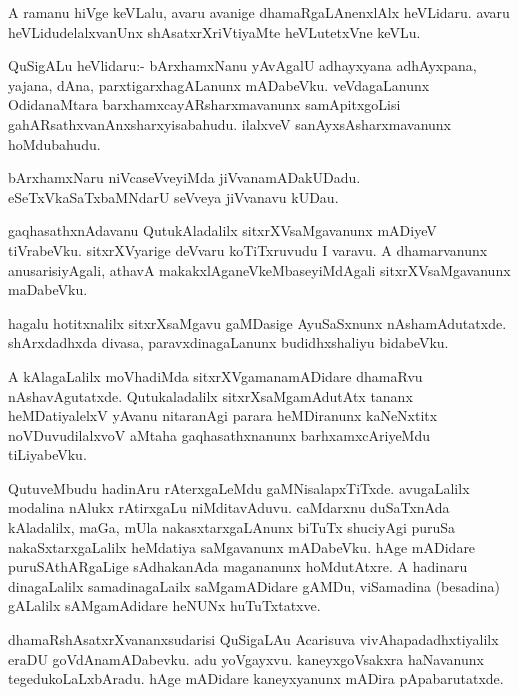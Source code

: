 \documentclass{article}
\begin{document}
\begin{mn}%
A ramanu hiVge keVLalu, avaru avanige dhamaRgaLAnenxlAlx heVLidaru. avaru heVLidudelalxvanUnx
shAsatxrXriVtiyaMte heVLutetxVne keVLu.
\end{mn}

\begin{mn}%
QuSigALu heVlidaru:- bArxhamxNanu yAvAgalU adhayxyana adhAyxpana, yajana, dAna, 
parxtigarxhagALanunx mADabeVku. veVdagaLanunx OdidanaMtara barxhamxcayARsharxmavanunx 
samApitxgoLisi gahARsathxvanAnxsharxyisabahudu. ilalxveV sanAyxsAsharxmavanunx hoMdubahudu.
\end{mn}

\begin{mn}%
bArxhamxNaru niVcaseVveyiMda jiVvanamADakUDadu. eSeTxVkaSaTxbaMNdarU seVveya jiVvanavu kUDau.
\end{mn}

\begin{mn}%
gaqhasathxnAdavanu QutukAladalilx sitxrXVsaMgavanunx mADiyeV tiVrabeVku. sitxrXVyarige 
deVvaru koTiTxruvudu I varavu. A dhamarvanunx anusarisiyAgali, athavA 
makakxlAganeVkeMbaseyiMdAgali sitxrXVsaMgavanunx maDabeVku.
\end{mn}

\begin{mn}%
hagalu hotitxnalilx sitxrXsaMgavu gaMDasige AyuSaSxnunx nAshamAdutatxde. shArxdadhxda 
divasa, paravxdinagaLanunx budidhxshaliyu bidabeVku.
\end{mn}

\begin{mn}%
A kAlagaLalilx moVhadiMda sitxrXVgamanamADidare dhamaRvu nAshavAgutatxde. Qutukaladalilx 
sitxrXsaMgamAdutAtx tananx heMDatiyalelxV yAvanu nitaranAgi parara heMDiranunx kaNeNxtitx 
noVDuvudilalxvoV aMtaha gaqhasathxnanunx barhxamxcAriyeMdu tiLiyabeVku.
\end{mn}

\begin{mn}%
QutuveMbudu hadinAru rAterxgaLeMdu gaMNisalapxTiTxde. avugaLalilx modalina nAlukx 
rAtirxgaLu niMditavAduvu. caMdarxnu duSaTxnAda kAladalilx, maGa, mUla nakasxtarxgaLAnunx 
biTuTx shuciyAgi puruSa nakaSxtarxgaLalilx heMdatiya saMgavanunx mADabeVku. hAge mADidare 
puruSAthARgaLige sAdhakanAda magananunx hoMdutAtxre. A hadinaru dinagaLalilx 
samadinagaLailx saMgamADidare gAMDu, viSamadina (besadina) gALalilx sAMgamAdidare heNUNx 
huTuTxtatxve.
\end{mn}

\begin{mn}%
dhamaRshAsatxrXvananxsudarisi QuSigaLAu Acarisuva vivAhapadadhxtiyalilx eraDU 
goVdAnamADabevku. adu yoVgayxvu. kaneyxgoVsakxra haNavanunx tegedukoLaLxbAradu. hAge 
mADidare kaneyxyanunx mADira pApabarutatxde.
\end{mn}
\end{document}
